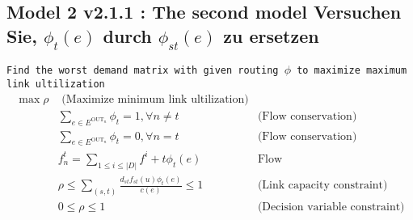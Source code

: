 \documentclass{ctexart}
\begin{document}
\subsection{Model 2 v2.1.1 : The second model Versuchen Sie, $\phi_t(e)$ durch $\phi_{st}(e)$ zu ersetzen}
\texttt{Find the worst demand matrix with given routing $\phi$  to maximize maximum link ultilization} 
\begin{equation}
	\begin{aligned}
		\max \rho & \text{  (Maximize minimum link ultilization)}\\
		& \sum_{e\in E^{\text{OUT}_n}} \phi_t=1, \forall n\not=t & \text{(Flow conservation)}\\
		& \sum_{e\in E^{\text{OUT}_n}} \phi_t=0, \forall n = t & \text{(Flow conservation)}\\
		& f_n^t =\sum_{1\leq i\leq |\textit{D}|}f^i+t\phi_t(e) & \text{Flow}\\
		& \rho\leq\sum_{(s,t)}\frac{
			d_{st}f_{st}(u)\phi_{t}(e)}{c(e)} \leq 1\ &  \text{(Link capacity constraint)} \\
		& 0\leq\rho\leq1& \text{(Decision variable constraint)}
	\end{aligned}
\end{equation}
\end{document}
